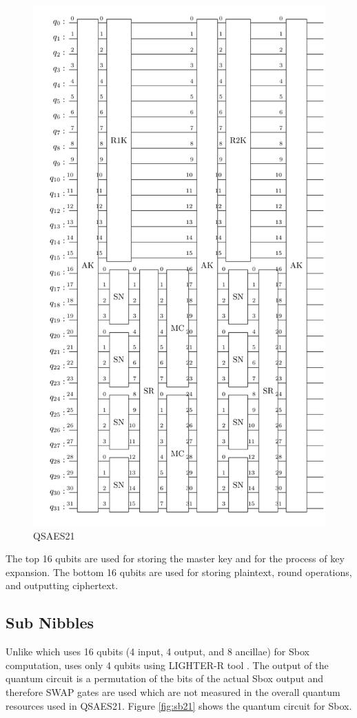 \documentclass[preprint]{transcrypto}
\begin{document}
\begin{figure}[h!]
    \centering
    \includegraphics[width=0.7\linewidth]{saes21/saes.pdf}
    \caption{QSAES21}
    \label{fig:qsaes21}
\end{figure}

The top 16 qubits are used for storing the master key and for the process of key expansion. The bottom 16 qubits are used for storing plaintext, round operations, and outputting ciphertext.

\subsection{Sub Nibbles}
Unlike \cite{Almazrooie} which uses 16 qubits (4 input, 4 output, and 8 ancillae) for Sbox computation, \cite{Jang} uses only 4 qubits using LIGHTER-R tool \cite{LighterR}. The output of the quantum circuit is a permutation of the bits of the actual Sbox output and therefore SWAP gates are used which are not measured in the overall quantum resources used in QSAES21. Figure \ref{fig:sb21} shows the quantum circuit for Sbox.
\end{document}
